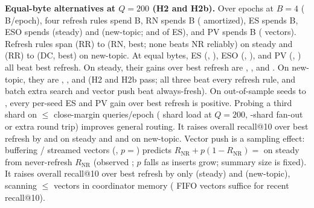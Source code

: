 \textbf{Equal-byte alternatives at $Q = 200$ (H2 and H2b).} Over \RNumNumEpochs{} epochs at $B{=}4$ (\RNumBudgetBFourEpochBytes{} B/epoch), four refresh rules spend \RNumMOneFourRulesBytes{} B, RN spends \RNumMOneRNBytes{} B (\RNumMOneRNAmortBytes{} amortized), ES spends \RNumMOneESBytes{} B, ESO spends \RNumMOneESOBytesSteady{} (steady) and \RNumMOneESOBytesNewTopic{} (new-topic; \RNumMOneESOShareOfESQTwoHundredSteady{} and \RNumMOneESOShareOfESQTwoHundredNewTopic{} of ES), and PV spends \RNumMOnePVBytes{} B (\RNumMOnePVPushedVecs{} vectors). Refresh rules span \RNumMOneRRRecentMeanSteady{} (RR) to \RNumMOneRNRecentMeanSteady{} (RN, best; none beats NR reliably) on steady and \RNumMOneRRRecentMeanNewTopic{} (RR) to \RNumMOneDCRecentMeanNewTopic{} (DC, best) on new-topic. At equal bytes, ES (\RNumMOneESRecentSteady{}, \RNumMOneESRecentNewTopic{}), ESO (\RNumMOneESORecentSteady{}, \RNumMOneESORecentNewTopic{}), and PV (\RNumMOnePVRecentSteady{}, \RNumMOnePVRecentNewTopic{}) all beat best refresh. On steady, their gains over best refresh are \RNumHTwoESvsRefreshSteady{}, \RNumHTwoBESOvsRefreshSteady{}, and \RNumHTwoPVvsRefreshSteady{}. On new-topic, they are \RNumHTwoESvsRefreshNewTopic{}, \RNumHTwoBESOvsRefreshNewTopic{}, and \RNumHTwoPVvsRefreshNewTopic{} (H2 and H2b pass; all three beat every refresh rule, and batch extra search and vector push beat always-fresh). On out-of-sample seeds \RNumOutOfSampleSeedMin{} to \RNumSeedMax{}, every per-seed ES and PV gain over best refresh is positive. Probing a third shard on $\le {}$\RNumExtraSearchesBFour{} close-margin queries/epoch (\RNumESLoadPctQTwoHundred{} shard load at $Q{=}200$, \RNumThreeShards{}-shard fan-out or extra round trip) improves general routing. It raises overall recall@10 over best refresh by \RNumHTwoESvsRefreshOverallSteady{} and \RNumHTwoBESOvsRefreshOverallSteady{} on steady and \RNumHTwoESvsRefreshOverallNewTopic{} and \RNumHTwoBESOvsRefreshOverallNewTopic{} on new-topic. Vector push is a sampling effect: buffering \RNumMOnePVPushedVecs{}/\RNumSteadyStreamTotalVecs{} streamed vectors (\RNumMOnePVShareSteady{}, $p = {}$\RNumMOnePVShareFracSteady{}) predicts $R_{\text{NR}} + p(1 - R_{\text{NR}}) = {}$\RNumMOnePVPredRecentSteady{} on steady from never-refresh $R_{\text{NR}}$ (observed \RNumMOnePVRecentSteady{}; $p$ falls as inserts grow; summary size is fixed). It raises overall recall@10 over best refresh by only \RNumHTwoPVvsRefreshOverallSteady{} (steady) and \RNumHTwoPVvsRefreshOverallNewTopic{} (new-topic), scanning $\le {}$\RNumPVMaxVecsBFour{} vectors in coordinator memory (\RNumPVFifoVecsBFour{} FIFO vectors suffice for recent recall@10).

